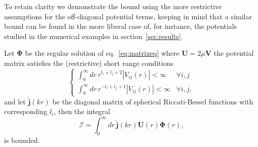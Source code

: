 \documentclass[mathpazo]{cicp}
\begin{document}
To retain clarity we demonstrate the bound using the more restrictive assumptions for the off-diagonal potential terms, keeping in mind that a similar bound can be found in the more liberal case of, for instance, the potentials studied in the numerical examples in section~\ref{sec:results}.

\begin{lemma}
\label{lem:integralbound}
	Let $\mathbold{\Phi}$ be the regular solution of eq.~\eqref{eq:matrixeq} where $\mathbold{U} = 2\mu\mathbold{V}$ the potential matrix satisfies the (restrictive) short range conditions
	\begin{equation}
		\label{eq:192007062010}
		\begin{cases}
			\int_0^\infty dr \, r^{l_{i}+l_{j}+2}|V_{ij}(r)| < \infty & \forall i,j\\
			\int_{0}^{\infty} dr\, r^{-l_{i}+l_{j}+1}|V_{ij}(r)| < \infty & \forall i,j,
		\end{cases}
	\end{equation}
	and let $\hat{\mathbold{j}}(kr)$ be the diagonal matrix of spherical Riccati-Bessel functions with corresponding $l_{i}$, then the integral
	\begin{equation}
		\mathbold{\mathcal{I}} = \int_0^\infty dr \, \hat{\mathbold{j}}(kr)\mathbold{U}(r) \mathbold{\Phi}(r) \label{eq:integral_riccati_potential_regular},
	\end{equation}
	is bounded.
\end{lemma}
\end{document}
